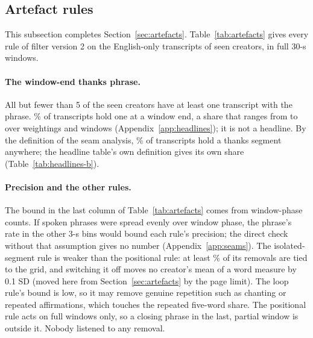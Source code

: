 \subsection{Artefact rules}
\label{app:artefacts}

This subsection completes Section~\ref{sec:artefacts}. Table~\ref{tab:artefacts} gives every rule of filter version 2 on
the English-only transcripts of seen creators, in full 30-s windows.

\paragraph{The window-end thanks phrase.} All but fewer than 5 of the \NSeen{} seen creators have at least one
transcript with the phrase. \ThanksTranscriptPct\% of transcripts hold one at a window end, a share that ranges from \ThanksWeightRangeLo{} to
\ThanksWeightRangeHi{} over weightings and windows (Appendix~\ref{app:headlines}); it is not a headline. By the
definition of the seam analysis, \ThanksAnywherePct\% of transcripts hold a thanks segment anywhere; the headline table's
own definition gives its own share (Table~\ref{tab:headlines-b}).

\paragraph{Precision and the other rules.} The bound in the last column of Table~\ref{tab:artefacts} comes from
window-phase counts. If spoken phrases were spread evenly over window phase, the phrase's rate in the other 3-s bins
would bound each rule's precision; the direct check without that assumption gives no number (Appendix~\ref{app:seams}).
The isolated-segment rule is weaker than the positional rule: at least \IsoGridTiedPct\% of its \IsoSegments{} removals
are tied to the grid, and switching it off moves no creator's mean of a word measure by 0.1 SD (moved here from
Section~\ref{sec:artefacts} by the page limit). The loop rule's bound is low, so it may remove genuine repetition such as chanting or repeated affirmations, which
touches the repeated five-word share. The positional rule acts on full windows only, so a closing phrase in the last,
partial window is outside it. Nobody listened to any removal.

\begin{table}[ht]
\centering
\small

\caption{Recognizer artefacts by rule of filter version 2, \NSeenEnglishOnly{} English-only transcripts of \NSeen{} seen
creators, full 30-s windows: units removed (Rem.), removals per 1,000 full windows, share of transcripts with one (90\%
creator bootstrap), creators with one, rate per hour of detector speech (90\%), and the precision bound from window-phase
counts, which assumes that spoken phrases spread evenly over window phase. The loop rule's bound is weak. Nothing was
checked by a person.}
\label{tab:artefacts}
\end{table}


